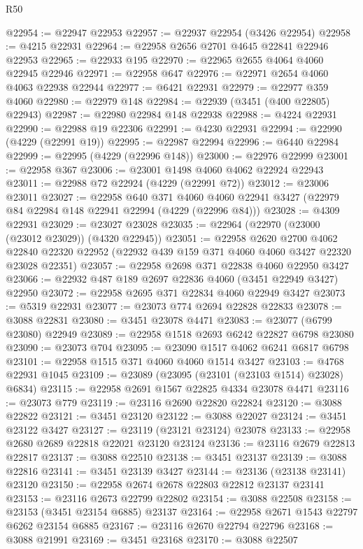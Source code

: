 \begin{lexlean}{R50}
\begin{coremodule}
@22954 := @22947 @22953
@22957 := @22937 @22954 (@3426 @22954)
@22958 := @4215 @22931
@22964 := @22958 @2656 @2701 @4645 @22841 @22946 @22953
@22965 := @22933 @195
@22970 := @22965 @2655 @4064 @4060 @22945 @22946
@22971 := @22958 @647
@22976 := @22971 @2654 @4060 @4063 @22938 @22944
@22977 := @6421 @22931
@22979 := @22977 @359 @4060
@22980 := @22979 @148
@22984 := @22939 (@3451 (@400 @22805) @22943)
@22987 := @22980 @22984 @148 @22938
@22988 := @4224 @22931
@22990 := @22988 @19 @22306
@22991 := @4230 @22931
@22994 := @22990 (@4229 (@22991 @19))
@22995 := @22987 @22994
@22996 := @6440 @22984
@22999 := @22995 (@4229 (@22996 @148))
@23000 := @22976 @22999
@23001 := @22958 @367
@23006 := @23001 @1498 @4060 @4062 @22924 @22943
@23011 := @22988 @72 @22924 (@4229 (@22991 @72))
@23012 := @23006 @23011
@23027 := @22958
    @640
    @371
    @4060
    @4060
    @22941
    @3427
    (@22979 @84 @22984 @148 @22941 @22994 (@4229 (@22996 @84)))
@23028 := @4309 @22931
@23029 := @23027 @23028
@23035 := @22964 (@22970 (@23000 (@23012 @23029)) (@4320 @22945))
@23051 := @22958
    @2620
    @2700
    @4062
    @22840
    @22320
    @22952
    (@22932 @439 @159 @371 @4060 @4060 @3427 @22320 @23028 @22351)
@23057 := @22958 @2698 @371 @22838 @4060 @22950 @3427
@23066 := @22932 @487 @189 @2697 @22836 @4060 (@3451 @22949 @3427) @22950
@23072 := @22958 @2695 @371 @22834 @4060 @22949 @3427
@23073 := @5319 @22931
@23077 := @23073 @774 @2694 @22828 @22833
@23078 := @3088 @22831
@23080 := @3451 @23078 @4471
@23083 := @23077 (@6799 @23080) @22949
@23089 := @22958 @1518 @2693 @6242 @22827 @6798 @23080
@23090 := @23073 @704
@23095 := @23090 @1517 @4062 @6241 @6817 @6798
@23101 := @22958 @1515 @371 @4060 @4060 @1514 @3427
@23103 := @4768 @22931 @1045
@23109 := @23089 (@23095 (@23101 (@23103 @1514) @23028) @6834)
@23115 := @22958 @2691 @1567 @22825 @4334 @23078 @4471
@23116 := @23073 @779
@23119 := @23116 @2690 @22820 @22824
@23120 := @3088 @22822
@23121 := @3451 @23120
@23122 := @3088 @22027
@23124 := @3451 @23122 @3427
@23127 := @23119 (@23121 @23124) @23078
@23133 := @22958 @2680 @2689 @22818 @22021 @23120 @23124
@23136 := @23116 @2679 @22813 @22817
@23137 := @3088 @22510
@23138 := @3451 @23137
@23139 := @3088 @22816
@23141 := @3451 @23139 @3427
@23144 := @23136 (@23138 @23141) @23120
@23150 := @22958 @2674 @2678 @22803 @22812 @23137 @23141
@23153 := @23116 @2673 @22799 @22802
@23154 := @3088 @22508
@23158 := @23153 (@3451 @23154 @6885) @23137
@23164 := @22958 @2671 @1543 @22797 @6262 @23154 @6885
@23167 := @23116 @2670 @22794 @22796
@23168 := @3088 @21991
@23169 := @3451 @23168
@23170 := @3088 @22507

\end{coremodule}
\end{lexlean}

